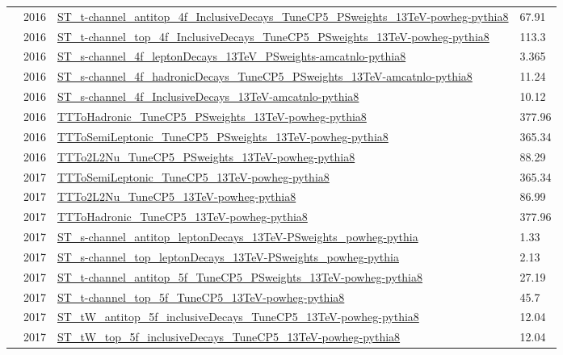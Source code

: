 \begin{table}
{\begin{tabular}{llll}
              & 2016 & \url{ST_t-channel_antitop_4f_InclusiveDecays_TuneCP5_PSweights_13TeV-powheg-pythia8} & 67.91              \\
              & 2016 & \url{ST_t-channel_top_4f_InclusiveDecays_TuneCP5_PSweights_13TeV-powheg-pythia8}     & 113.3              \\
              & 2016 & \url{ST_s-channel_4f_leptonDecays_13TeV_PSweights-amcatnlo-pythia8}                  & 3.365              \\
              & 2016 & \url{ST_s-channel_4f_hadronicDecays_TuneCP5_PSweights_13TeV-amcatnlo-pythia8}        & 11.24              \\
              & 2016 & \url{ST_s-channel_4f_InclusiveDecays_13TeV-amcatnlo-pythia8}                         & 10.12              \\
              & 2016 & \url{TTToHadronic_TuneCP5_PSweights_13TeV-powheg-pythia8}                            & 377.96             \\
              & 2016 & \url{TTToSemiLeptonic_TuneCP5_PSweights_13TeV-powheg-pythia8}                        & 365.34             \\
              & 2016 & \url{TTTo2L2Nu_TuneCP5_PSweights_13TeV-powheg-pythia8}                               & 88.29              \\
      \cmidrule(lr){2-4}
              & 2017 & \url{TTToSemiLeptonic_TuneCP5_13TeV-powheg-pythia8}                                  & 365.34             \\
              & 2017 & \url{TTTo2L2Nu_TuneCP5_13TeV-powheg-pythia8}                                         & 86.99              \\
              & 2017 & \url{TTToHadronic_TuneCP5_13TeV-powheg-pythia8}                                      & 377.96             \\
              & 2017 & \url{ST_s-channel_antitop_leptonDecays_13TeV-PSweights_powheg-pythia}                & 1.33               \\
              & 2017 & \url{ST_s-channel_top_leptonDecays_13TeV-PSweights_powheg-pythia}                    & 2.13               \\
              & 2017 & \url{ST_t-channel_antitop_5f_TuneCP5_PSweights_13TeV-powheg-pythia8}                 & 27.19              \\
              & 2017 & \url{ST_t-channel_top_5f_TuneCP5_13TeV-powheg-pythia8}                               & 45.7               \\
              & 2017 & \url{ST_tW_antitop_5f_inclusiveDecays_TuneCP5_13TeV-powheg-pythia8}                  & 12.04              \\
              & 2017 & \url{ST_tW_top_5f_inclusiveDecays_TuneCP5_13TeV-powheg-pythia8}                      & 12.04              \\
      \bottomrule
    \end{tabular}%
  }\label{tab:mc-list-2}
\end{table}

